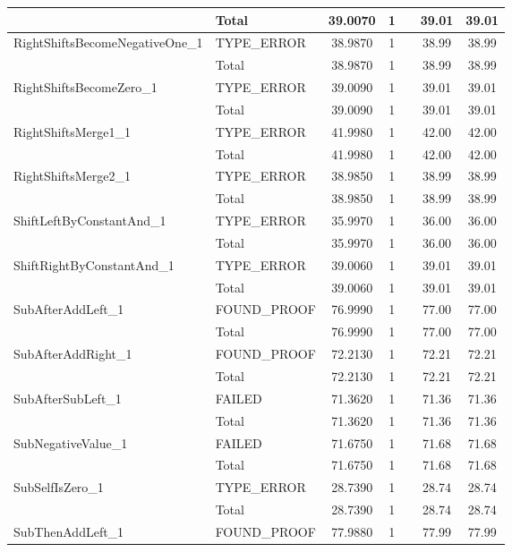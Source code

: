 \begin{appendices}
\begin{longtable}{L{0.25\textwidth} L{0.2\textwidth}  c  c  c  c  c }
    & Total & 39.0070 & 1 &  & 39.01 & 39.01 \\ \midrule 
    RightShiftsBecomeNegativeOne\_1 & TYPE\_ERROR & 38.9870 & 1 &  & 38.99 & 38.99 \\ \midrule 
    & Total & 38.9870 & 1 &  & 38.99 & 38.99 \\ \midrule 
    RightShiftsBecomeZero\_1 & TYPE\_ERROR & 39.0090 & 1 &  & 39.01 & 39.01 \\ \midrule 
    & Total & 39.0090 & 1 &  & 39.01 & 39.01 \\ \midrule 
    RightShiftsMerge1\_1 & TYPE\_ERROR & 41.9980 & 1 &  & 42.00 & 42.00 \\ \midrule 
    & Total & 41.9980 & 1 &  & 42.00 & 42.00 \\ \midrule 
    RightShiftsMerge2\_1 & TYPE\_ERROR & 38.9850 & 1 &  & 38.99 & 38.99 \\ \midrule 
    & Total & 38.9850 & 1 &  & 38.99 & 38.99 \\ \midrule 
    ShiftLeftByConstantAnd\_1 & TYPE\_ERROR & 35.9970 & 1 &  & 36.00 & 36.00 \\ \midrule 
    & Total & 35.9970 & 1 &  & 36.00 & 36.00 \\ \midrule 
    ShiftRightByConstantAnd\_1 & TYPE\_ERROR & 39.0060 & 1 &  & 39.01 & 39.01 \\ \midrule 
    & Total & 39.0060 & 1 &  & 39.01 & 39.01 \\ \midrule 
    SubAfterAddLeft\_1 & FOUND\_PROOF & 76.9990 & 1 &  & 77.00 & 77.00 \\ \midrule 
    & Total & 76.9990 & 1 &  & 77.00 & 77.00 \\ \midrule 
    SubAfterAddRight\_1 & FOUND\_PROOF & 72.2130 & 1 &  & 72.21 & 72.21 \\ \midrule 
    & Total & 72.2130 & 1 &  & 72.21 & 72.21 \\ \midrule 
    SubAfterSubLeft\_1 & FAILED & 71.3620 & 1 &  & 71.36 & 71.36 \\ \midrule 
    & Total & 71.3620 & 1 &  & 71.36 & 71.36 \\ \midrule 
    SubNegativeValue\_1 & FAILED & 71.6750 & 1 &  & 71.68 & 71.68 \\ \midrule 
    & Total & 71.6750 & 1 &  & 71.68 & 71.68 \\ \midrule 
    SubSelfIsZero\_1 & TYPE\_ERROR & 28.7390 & 1 &  & 28.74 & 28.74 \\ \midrule 
    & Total & 28.7390 & 1 &  & 28.74 & 28.74 \\ \midrule 
    SubThenAddLeft\_1 & FOUND\_PROOF & 77.9880 & 1 &  & 77.99 & 77.99 \\ \midrule 

\end{longtable}
\end{appendices}
